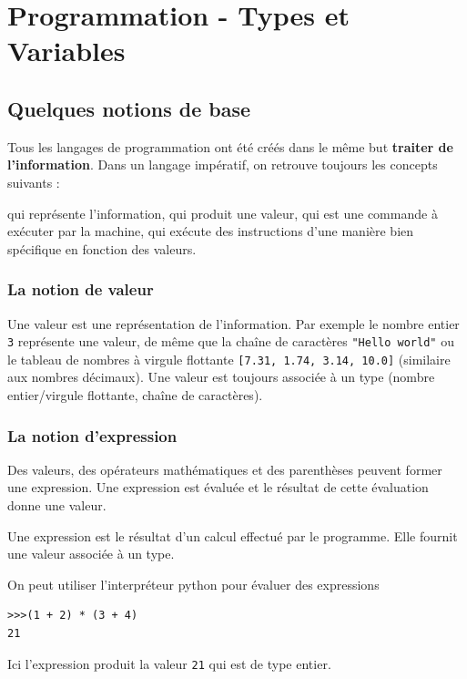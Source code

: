 \documentclass[11pt, a4paper]{book}
\begin{document}
\setcounter{chapter}{6}

\chapter{Programmation - Types et Variables}


\section{Quelques notions de base}

Tous les langages de programmation ont été créés dans le même but \textbf{traiter de l'information}. Dans un langage impératif, on retrouve toujours les concepts suivants : 
\begin{itemize}
	 qui représente l'information,
	 qui produit une valeur,
	 qui est une commande à exécuter par la machine,
	 qui exécute des instructions d'une manière bien spécifique en fonction des valeurs.
\end{itemize}

\subsection{La notion de valeur}
Une valeur est une représentation de l'information. Par exemple le nombre entier \lstinline{3} représente une valeur, de même que la chaîne de caractères \lstinline{"Hello world"} ou le tableau de nombres à virgule flottante \lstinline{[7.31, 1.74, 3.14, 10.0]}  (similaire aux nombres décimaux). Une valeur est toujours associée à un type (nombre entier/virgule flottante, chaîne de caractères).\\

\subsection{La notion d'expression}
Des valeurs, des opérateurs mathématiques et des parenthèses peuvent former une expression. Une expression est évaluée et le résultat de cette évaluation donne une valeur. 
\begin{mydefinition}
	Une expression est le résultat d'un calcul effectué par le programme. Elle fournit une valeur associée à un type.
\end{mydefinition}

On peut utiliser l'interpréteur python pour évaluer des expressions
\begin{myexample}
	\begin{lstlisting}[numbers=none]
>>>(1 + 2) * (3 + 4)
21
	\end{lstlisting}
	Ici l'expression produit la valeur \lstinline{21} qui est de type entier.
\end{myexample}
\end{document}
